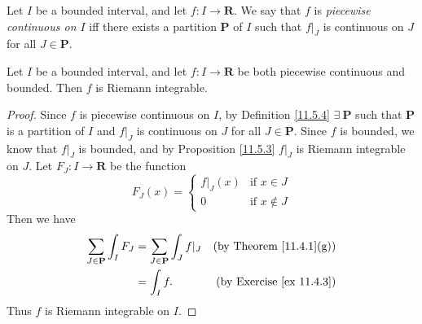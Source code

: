 \begin{definition}\label{11.5.4}
    Let \(I\) be a bounded interval, and let \(f : I \to \mathbf{R}\).
    We say that \(f\) is \emph{piecewise continuous on \(I\)} iff there exists a partition \(\mathbf{P}\) of \(I\) such that \(f|_J\) is continuous on \(J\) for all \(J \in \mathbf{P}\).
\end{definition}

\setcounter{theorem}{5}
\begin{proposition}\label{11.5.6}
    Let \(I\) be a bounded interval, and let \(f : I \to \mathbf{R}\) be both piecewise continuous and bounded.
    Then \(f\) is Riemann integrable.
\end{proposition}

\begin{proof}
    Since \(f\) is piecewise continuous on \(I\), by Definition \ref{11.5.4} \(\exists\ \mathbf{P}\) such that \(\mathbf{P}\) is a partition of \(I\) and \(f|_J\) is continuous on \(J\) for all \(J \in \mathbf{P}\).
    Since \(f\) is bounded, we know that \(f|_J\) is bounded, and by Proposition \ref{11.5.3} \(f|_J\) is Riemann integrable on \(J\).
    Let \(F_J : I \to \mathbf{R}\) be the function
    \[
        F_J(x) = \begin{cases}
            f|_J(x) & \text{if } x \in J    \\
            0       & \text{if } x \notin J
        \end{cases}
    \]
    Then we have
    \begin{align*}
        \sum_{J \in \mathbf{P}} \int_I F_J & = \sum_{J \in \mathbf{P}} \int_J f|_J & \text{(by Theorem \ref{11.4.1}(g))}  \\
                                           & = \int_I f.                           & \text{(by Exercise \ref{ex 11.4.3})}
    \end{align*}
    Thus \(f\) is Riemann integrable on \(I\).
\end{proof}